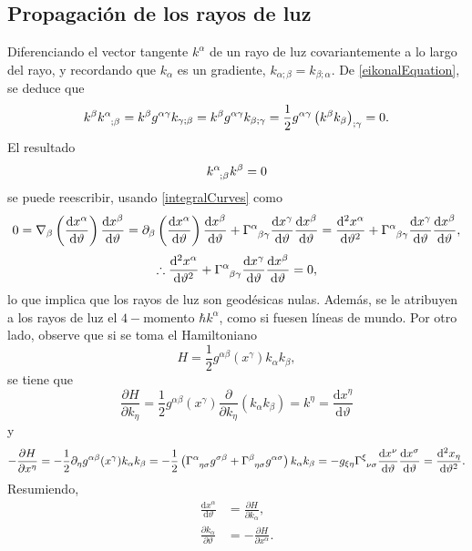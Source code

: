 \subsection{Propagación de los rayos de luz}
Diferenciando el vector tangente $k^\alpha$ de un rayo de luz covariantemente a lo largo del rayo, y recordando que $k_\alpha$ es un gradiente, $k_{\alpha;\beta}=k_{\beta;\alpha}$. De \eqref{eikonalEquation}, se deduce que
$$k^\beta k\indices{^\alpha_{;\beta}}=k^\beta g^{\alpha\gamma}k_{\gamma;\beta}=k^\beta g^{\alpha\gamma}k_{\beta;\gamma}=\frac{1}{2}g^{\alpha\gamma}\left( k^\beta k_\beta \right)_{;\gamma}=0.$$
El resultado
\begin{equation}
	k\indices{^\alpha_{;\beta}}k^\beta =0
\end{equation}
se puede reescribir, usando \eqref{integralCurves} como
\begin{dmath*}
0=\nabla_\beta \left( \frac{\mathrm{d}x^\alpha}{\mathrm{d}\vartheta}\right)\frac{\mathrm{d}x^\beta}{\mathrm{d}\vartheta}=\partial_\beta \left( \frac{\mathrm{d}x^\alpha}{\mathrm{d}\vartheta}\right)\frac{\mathrm{d}x^\beta}{\mathrm{d}\vartheta} + \Gamma\indices{^\alpha_{\beta\gamma}} \frac{\mathrm{d}x^\gamma}{\mathrm{d}\vartheta}\frac{\mathrm{d}x^\beta}{\mathrm{d}\vartheta}=\frac{\mathrm{d}^2 x^\alpha}{\mathrm{d}\vartheta^2}+\Gamma\indices{^\alpha_{\beta\gamma}} \frac{\mathrm{d}x^\gamma}{\mathrm{d}\vartheta}\frac{\mathrm{d}x^\beta}{\mathrm{d}\vartheta},
\end{dmath*}
\begin{equation}\label{geodesicLight}
\therefore  \frac{\mathrm{d}^2 x^\alpha}{\mathrm{d}\vartheta^2}+\Gamma\indices{^\alpha_{\beta\gamma}} \frac{\mathrm{d}x^\gamma}{\mathrm{d}\vartheta}\frac{\mathrm{d}x^\beta}{\mathrm{d}\vartheta}=0,
\end{equation}
lo que implica que los rayos de luz son geodésicas nulas. Además, se le atribuyen a los rayos de luz el $4-$momento $\hbar k^\alpha$, como si fuesen líneas de mundo. Por otro lado, observe que si se toma el Hamiltoniano
\begin{equation}\label{hamiltonianLight}
	H=\frac{1}{2}g^{\alpha\beta}(x^\gamma)k_\alpha k_\beta,
\end{equation}
se tiene que
$$\frac{\partial H}{\partial k_\eta}=\frac{1}{2}g^{\alpha\beta}(x^\gamma)\frac{\partial}{\partial k_\eta} \left( k_\alpha k_\beta \right)=k^\eta=\frac{\mathrm{d}x^\eta}{\mathrm{d}\vartheta}$$
y
$$-\frac{\partial H}{\partial x^\eta}=-\frac{1}{2}\partial_\eta g^{\alpha\beta}(x^\gamma)k_\alpha k_\beta=-\frac{1}{2}\left( \Gamma\indices{^\alpha_{\eta\sigma}}g^{\sigma\beta}+\Gamma\indices{^\beta_{\eta\sigma}}g^{\alpha\sigma} \right)k_\alpha k_\beta=-g_{\xi\eta}\Gamma\indices{^\xi_{\nu\sigma}}\frac{\mathrm{d}x^\nu}{\mathrm{d}\vartheta}\frac{\mathrm{d}x^\sigma}{\mathrm{d}\vartheta}=\frac{\mathrm{d}^2 x_\eta}{\mathrm{d}\vartheta^2}.$$
Resumiendo,
\begin{align}
\label{hamiltonLight1}
\frac{\mathrm{d}x^\alpha}{\mathrm{d}\vartheta} &=  \frac{\partial H}{\partial k_\alpha},\\
\label{hamiltonLight2}
\frac{\partial k_\alpha}{\partial\vartheta} &=  -\frac{\partial H}{\partial x^\alpha}.
\end{align}
